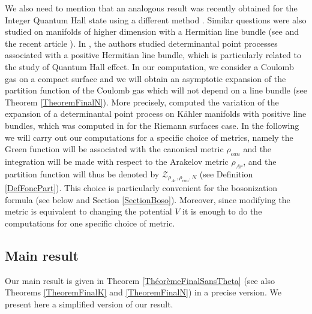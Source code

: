 \documentclass{article}
\theoremstyle{definition}
\theoremstyle{remark}
\begin{document}
  We also need to mention that an analogous result was recently obtained for the  Integer Quantum Hall state using a different method \cite{Shen:GeomZabrodin2025}. Similar questions were also studied on manifolds of higher dimension with a Hermitian line bundle (see \cite{Berman2014CMP327DetPPLDP+Boso} and the recent article \cite{Eum2025PartitionFunctionDPP}). In \cite{Berman2014CMP327DetPPLDP+Boso, Eum2025PartitionFunctionDPP, Shen:GeomZabrodin2025}, the authors studied determinantal point processes associated with a positive Hermitian line bundle, which is particularly related to the study of Quantum Hall effect. In our computation, we consider a Coulomb gas on a compact surface and we will obtain an asymptotic expansion of the partition function of the Coulomb gas which will not depend on a line bundle (see Theorem \ref{TheoremFinalN}). More precisely, \cite{Eum2025PartitionFunctionDPP} computed the variation of the expansion of a determinantal point process on Kähler manifolds with positive line bundles, which was computed in \cite{KlevtsovQuillen} for the Riemann surfaces case. In the following we will carry out our computations for a specific choice of metrics, namely the Green function will be associated with the canonical metric $\rho_{can}$ and the integration will be made with respect to the Arakelov metric $\rho_{Ar}$, and the partition function will thus be denoted by $\mathcal{Z}_{\rho_{Ar},\rho_{can},N}$ (see Definition \ref{DefFoncPart}). This choice is particularly convenient for the bosonization formula (see below and Section \ref{SectionBoso}). Moreover, since modifying the metric is equivalent to changing the potential $V$ it is enough to do the computations for one specific choice of metric.
  
\subsection{Main result}

Our main result is given in Theorem \ref{ThéorèmeFinalSansTheta} (see also Theorems \ref{TheoremFinalK} and \ref{TheoremFinalN}) in a precise version. We present here a simplified version of our result.
\end{document}
